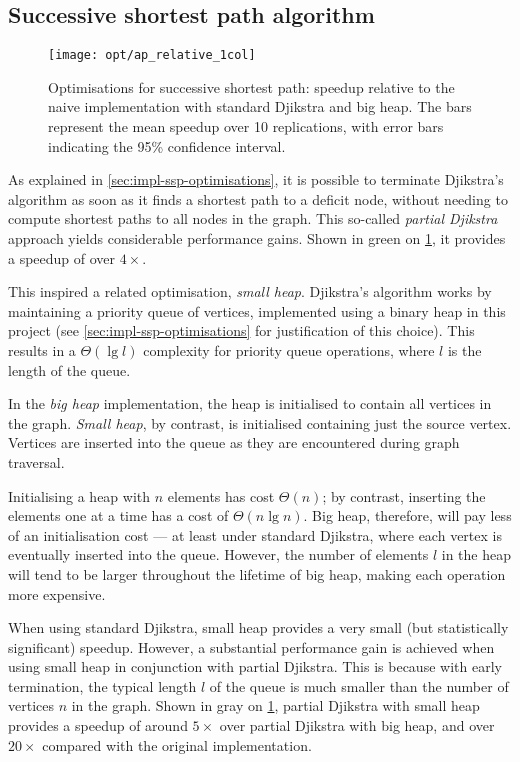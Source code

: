 \subsection{Successive shortest path algorithm}

\begin{figure}
    \centering
    \texttt{[image: opt/ap\_relative\_1col]}
    \caption[Optimisations for successive shortest path]{Optimisations for successive shortest path: speedup relative to the naive implementation with standard Djikstra and big heap. The bars represent the mean speedup over 10 replications, with error bars indicating the 95\% confidence interval.}
    \label{fig:opt-ap}
\end{figure}

As explained in \cref{sec:impl-ssp-optimisations}, it is possible to terminate Djikstra's algorithm as soon as it finds a shortest path to a deficit node, without needing to compute shortest paths to all nodes in the graph. This so-called \emph{partial Djikstra} approach yields considerable performance gains. Shown in green on \cref{fig:opt-ap}, it provides a speedup of over $4\times$.

This inspired a related optimisation, \emph{small heap}. Djikstra's algorithm works by maintaining a priority queue of vertices, implemented using a binary heap in this project (see \cref{sec:impl-ssp-optimisations} for justification of this choice). This results in a $\Theta\left(\lg l\right)$ complexity for priority queue operations, where $l$ is the length of the queue.

In the \emph{big heap} implementation, the heap is initialised to contain all vertices in the graph. \emph{Small heap}, by contrast, is initialised containing just the source vertex. Vertices are inserted into the queue as they are encountered during graph traversal.

Initialising a heap with $n$ elements has cost $\Theta(n)$; by contrast, inserting the elements one at a time has a cost of $\Theta(n\lg n)$. Big heap, therefore, will pay less of an initialisation cost --- at least under standard Djikstra, where each vertex is eventually inserted into the queue. However, the number of elements $l$ in the heap will tend to be larger throughout the lifetime of big heap, making each operation more expensive.

When using standard Djikstra, small heap provides a very small (but statistically significant) speedup. However, a substantial performance gain is achieved when using small heap in conjunction with partial Djikstra. This is because with early termination, the typical length $l$ of the queue is much smaller than the number of vertices $n$ in the graph. Shown in gray on \cref{fig:opt-ap}, partial Djikstra with small heap provides a speedup of around $5\times$ over partial Djikstra with big heap, and over $20\times$ compared with the original implementation.

